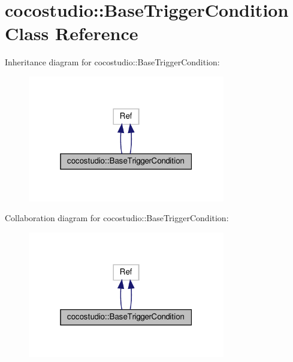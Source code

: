 \hypertarget{classcocostudio_1_1BaseTriggerCondition}{}\section{cocostudio\+:\+:Base\+Trigger\+Condition Class Reference}
\label{classcocostudio_1_1BaseTriggerCondition}


Inheritance diagram for cocostudio\+:\+:Base\+Trigger\+Condition\+:
\nopagebreak
\begin{figure}[H]
\begin{center}
\leavevmode
\includegraphics[width=244pt]{classcocostudio_1_1BaseTriggerCondition__inherit__graph}
\end{center}
\end{figure}


Collaboration diagram for cocostudio\+:\+:Base\+Trigger\+Condition\+:
\nopagebreak
\begin{figure}[H]
\begin{center}
\leavevmode
\includegraphics[width=244pt]{classcocostudio_1_1BaseTriggerCondition__coll__graph}
\end{center}
\end{figure}
